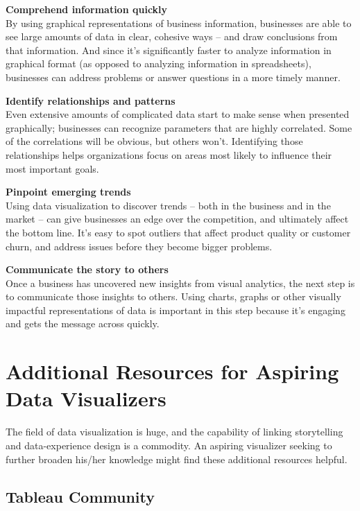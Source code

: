 \documentclass[]{book}
\begin{document}
\textbf{Comprehend information quickly}\\
By using graphical representations of business information, businesses
are able to see large amounts of data in clear, cohesive ways -- and
draw conclusions from that information. And since it's significantly
faster to analyze information in graphical format (as opposed to
analyzing information in spreadsheets), businesses can address problems
or answer questions in a more timely manner.

\textbf{Identify relationships and patterns}\\
Even extensive amounts of complicated data start to make sense when
presented graphically; businesses can recognize parameters that are
highly correlated. Some of the correlations will be obvious, but others
won't. Identifying those relationships helps organizations focus on
areas most likely to influence their most important goals.

\textbf{Pinpoint emerging trends}\\
Using data visualization to discover trends -- both in the business and
in the market -- can give businesses an edge over the competition, and
ultimately affect the bottom line. It's easy to spot outliers that
affect product quality or customer churn, and address issues before they
become bigger problems.

\textbf{Communicate the story to others}\\
Once a business has uncovered new insights from visual analytics, the
next step is to communicate those insights to others. Using charts,
graphs or other visually impactful representations of data is important
in this step because it's engaging and gets the message across quickly.

\section{Additional Resources for Aspiring Data
Visualizers}\label{additional-resources-for-aspiring-data-visualizers}

The field of data visualization is huge, and the capability of linking
storytelling and data-experience design is a commodity. An aspiring
visualizer seeking to further broaden his/her knowledge might find these
additional resources helpful.

\subsection{Tableau Community}\label{tableau-community-1}
\end{document}

